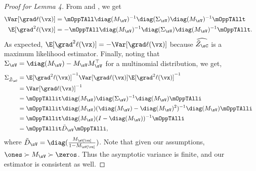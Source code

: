 \begin{proof}[Proof for Lemma 4]
From  and , we get
  \begin{align*}
    \Var [\grad \ell(\vx)] &= \mOppTAll \diag(M_\sV)^{-1} \diag(\Sigma_\sV) \diag(M_\sV)^{-1} \mOppTAllt \\
    \E[\grad^2 \ell(\vx)] &= -\mOppTAll \diag(M_\sV)^{-1} \diag(\Sigma_\sV) \diag(M_\sV)^{-1} \mOppTAllt.
  \end{align*}
As expected, $\E[\grad^2 \ell(\vx)] = -\Var [\grad \ell(\vx)]$ because $\widehat{\tilde Z_\sC}$ is a maximum likelihood estimator. 
Finally, noting that $\Sigma_\sV = \diag(M_\sV) - M_\sV M_\sV^\top$ for
  a multinomial distribution, we get,
\begin{align*}
    \Sigma_{\tilde Z_\sC} 
      &= \E[\grad^2 \ell(\vx)]^{-1} \Var [\grad \ell(\vx)] \E[\grad^2 \ell(\vx)]^{-1} \\
      &= \Var[\grad \ell(\vx)]^{-1} \\
      &= \mOppTAllit \diag(M_\sV) \diag(\Sigma_\sV)^{-1} \diag(M_\sV) \mOppTAlli \\
      &= \mOppTAllit \diag(M_\sV) (\diag(M_\sV) - \diag(M_\sV)^2)^{-1} \diag(M_\sV) \mOppTAlli \\
      &= \mOppTAllit \diag(M_\sV) (I - \diag(M_\sV))^{-1} \mOppTAlli \\
      &= \mOppTAllit \tilde D_\sV \mOppTAlli,
\end{align*}
where $\tilde D_\sV = \diag( \frac{M_\sV[\vx]}{1 - M_\sV[\vx]} )$.
Note that given our assumptions, $\ones \succ M_\sV \succ \zeros$. Thus
the asymptotic variance is finite, and our estimator is consistent as
well.

% 


\end{proof}
